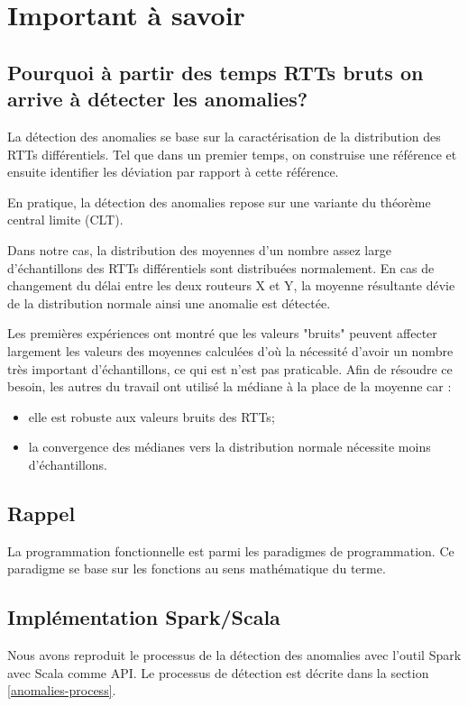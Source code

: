 
\chapter{Important à savoir}
\section{Pourquoi à partir des temps RTTs bruts on arrive à détecter les anomalies?}


La détection des anomalies se base sur la caractérisation de la distribution des RTTs différentiels. Tel que dans un premier temps, on construise une référence et ensuite identifier les déviation par rapport à cette référence.


En pratique, la détection des anomalies repose sur une variante du théorème central limite (CLT).

Dans notre cas, la distribution des moyennes d'un nombre assez large d'échantillons des RTTs différentiels sont distribuées normalement. En cas de changement du délai entre les deux routeurs X et Y, la moyenne résultante dévie de la distribution normale ainsi une anomalie est détectée.


Les premières expériences ont montré que les valeurs "bruits" peuvent affecter largement les valeurs des moyennes calculées d'où la nécessité d'avoir un nombre très important d'échantillons, ce qui est n'est pas praticable. Afin de résoudre ce besoin, les autres du travail ont utilisé la médiane à la place de la moyenne car :

\begin{itemize}
	\item elle est robuste aux valeurs bruits des RTTs;
	\item la convergence des médianes vers la distribution normale nécessite moins d'échantillons. 
\end{itemize}


\section{Rappel}
La programmation fonctionnelle est parmi les paradigmes de programmation.  Ce paradigme se base sur les fonctions au sens mathématique du terme.




\section{Implémentation Spark/Scala}
Nous avons reproduit le processus de la détection des anomalies avec l'outil Spark avec Scala comme API. Le processus de détection est décrite dans la section \ref{anomalies-process}.
 
